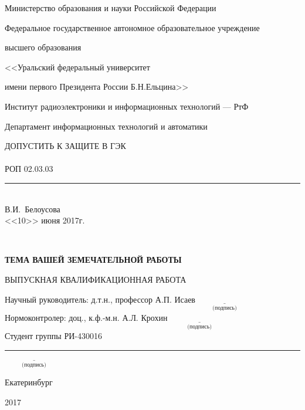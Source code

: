 \documentclass[a4paper,14pt,oneside]{book}
\theoremstyle{plain} %
\theoremstyle{definition} %
\theoremstyle{remark} %
\begin{document}


\begin{titlepage}
{\small
\centerline{Министерство образования и науки Российской Федерации}
\centerline{Федеральное государственное автономное образовательное учреждение}
\centerline{высшего образования}
\centerline{\normalsize<<Уральский федеральный университет}
\centerline{\normalsize имени первого Президента России Б.Н.Ельцина>>}
\vskip0.2cm
\centerline{\normalsize Институт радиоэлектроники и информационных технологий --- РтФ}
\vskip0.2cm\centerline{\normalsize Департамент информационных технологий и автоматики}
}
\vskip1cm

\null\hfill
\begin{minipage}{0.6\textwidth}
\hfill ДОПУСТИТЬ К ЗАЩИТЕ В ГЭК \\ \\
РОП 02.03.03\rule[-1pt]{3.5cm}{0.4pt}
\\\phantom{XXXXXXXXXXXXXXXXXXX} В.И.~Белоусова
\\%
\hfill <<10>> июня  2017г.
\end{minipage}\\
\vskip2cm
\centerline{\bf ТЕМА ВАШЕЙ ЗЕМЕЧАТЕЛЬНОЙ РАБОТЫ}
\vskip0.2cm
\centerline{{ВЫПУСКНАЯ КВАЛИФИКАЦИОННАЯ РАБОТА}}

\vskip5.5cm
\noindent
Научный руководитель: д.т.н., профессор А.П. Исаев\hfill $\underset{\text{(подпись)}}{\underline{\hspace{3cm}}}$\\
\vskip0.2cm
Нормоконтролер: доц., к.ф.-м.н. А.Л. Крохин \hfill $\underset{\text{(подпись)}}{\underline{\hspace{3cm}}}$\\
\vskip0.2cm
Студент группы  РИ-430016\rule[-1pt]{1.5cm}{0.4pt} \hfill $\underset{\text{(подпись)}}{\underline{\hspace{3cm}}}$\\
\vfill
\centerline{Екатеринбург}
\centerline{2017}
\end{titlepage}
\end{document}
